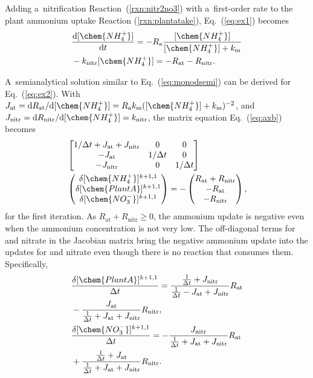 \documentclass[gmd,noline]{copernicus}
\begin{document}
      Adding a~nitrification Reaction~(\ref{rxn:nitr2no3}) with
      a~first-order rate to the plant ammonium uptake Reaction
      (\ref{rxn:plantatake}), Eq.~(\ref{eq:ex1}) becomes
\begin{align}
 &
\frac{\mathrm{d} [\chem{NH_4^+}]}{\mathrm{d}t} = - R_\mathrm{a}
\frac{[\chem{NH_4^+}]}{[\chem{NH_4^+}]+k_\mathrm{m}} \nonumber\\&-
k_{\text{nitr}} [\chem{NH_4^+}] = -R_{\text{at}} - R_{\text{nitr}}.
\label{eq:ex2}
\end{align}%

      A~semianalytical solution similar to Eq.~(\ref{eq:monodsemi}) can be
      derived for Eq.~(\ref{eq:ex2}). With $J_{\text{at}} = \mathrm{d}
      R_{\text{at}}/\mathrm{d} [\chem{NH_4^+}] =
      R_\mathrm{a}k_\mathrm{m}([\chem{NH_4^+}] + k_\mathrm{m})^{-2}$, and
      $J_{\text{nitr}} = \mathrm{d} R_{\text{nitr}}/\mathrm{d}
      [\chem{NH_4^+}]=k_{\text{nitr}}$, the matrix equation
      Eq.~(\ref{eq:axb}) becomes
\begin{align}
 &
\left[
\begin{matrix}
1/\Delta t + J_{\text{at}} + J_{\text{nitr}} & 0 & 0 \\
-J_{\text{at}} & 1/\Delta t & 0 \\
-J_{\text{nitr}} & 0 & 1/\Delta t \\
\end{matrix}
\right]\nonumber\\& \left(\begin{matrix}
\delta [\chem{NH_4^+}]^{k+1,1} \\
\delta [\chem{PlantA}]^{k+1,1} \\
\delta [\chem{NO_3^-}]^{k+1,1}
\end{matrix}
\right)
=-
\left(\begin{matrix}
R_{\text{at}} + R_{\text{nitr}} \\
-R_{\text{at}} \\
-R_{\text{nitr}}
\end{matrix}
\right),
\label{eq:test2}
\end{align}%
      for the first iteration. As $R_{\text{at}} + R_{\text{nitr}} \geq 0$,
      the ammonium update is negative even when the ammonium concentration
      is not very low. The off-diagonal terms for  and nitrate
      in the Jacobian matrix bring the negative ammonium update into the
      updates for  and nitrate even though there is no reaction
      that consumes them. Specifically,
\begin{align}
 &
\frac{\delta [\chem{PlantA}]^{k+1,1}}{\Delta t} = \frac{\frac{1}{\Delta t} +
J_{\text{nitr}}}{\frac{1}{\Delta t} - J_{\text{at}} +
J_{\text{nitr}}} R_{\text{at}}\nonumber\\& - \frac{J_{\text{at}}}
{\frac{1}{\Delta t} + J_{\text{at}} + J_{\text{nitr}}} R_{\text{nitr}},
\\
& \frac{\delta [\chem{NO_3^-}]^{k+1,1}}{\Delta t} =
-\frac{J_{\text{nitr}}}{\frac{1}{\Delta t} + J_{\text{at}} + J_{\text{nitr}}}
R_{\text{at}} \nonumber\\& + \frac{\frac{1}{\Delta t} + J_{\text{at}}}
{\frac{1}{\Delta t} + J_{\text{at}} + J_{\text{nitr}}} R_{\text{nitr}}.
\end{align}%
\end{document}
